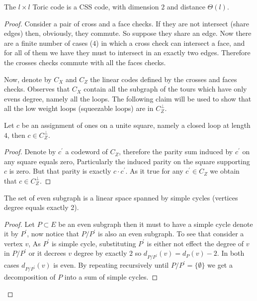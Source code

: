 \documentclass[12pt,a4paper]{article}
\begin{document}
\begin{claim}
  The $l \times l$  Toric code is a CSS code, with dimension $2$ and distance $\Theta\left( l \right)$.   
\end{claim}
\begin{proof}
  Consider a pair of cross and a face checks. If they are not intersect (share edges) then, obviously, they commute. So suppose they share an edge. Now there are a finite number of cases ($4$) in which a cross check can intersect a face, and for all of them we have they must to intersect in an exactly two edges. Therefore the crosses checks commute with all the faces checks. 

  Now, denote by $C_{X}$ and $C_{Z}$ the linear codes defined by the crosses and faces checks. Observes that $C_{X}$ contain all the subgraph of the tours which have only evens degree, namely all the loops. The following claim will be used to show that all the low weight loops (squeezable loops) are in $C_{Z}^{\perp}$. 
  \begin{claim} \label{claim:square}
    Let $c$ be an assignment of ones on a unite square, namely a closed loop at length $4$, then $c \in C_{Z}^{\perp}$.  
  \end{claim}
  \begin{proof}
    Denote by $c^{\prime}$ a codeword of $C_{Z}$, therefore the parity sum induced by $c^{\prime}$ on any square equals zero, Particularly the induced parity on the square supporting $c$ is zero. But that parity is exactly $c\cdot c^{\prime}$. As it true for any $c^{\prime} \in C_{Z}$ we obtain that $c \in C_{Z}^{\perp}$.  
  \end{proof}
  \begin{claim} \label{claim:velen}
    The set of even subgraph is a linear space spanned by simple cycles (vertices degree equals exactly 2).
  \end{claim}
  \begin{proof}
    Let $P \subset E$ be an even subgraph then it must to have a simple cycle denote it by $P^{\prime}$, now notice that $P/P^\prime$ is also an even subgraph. To see that consider a vertex $v$, As $P^{\prime}$ is simple cycle, substituting $P^{\prime}$ is either not effect the degree of $v$ in $P/P^{\prime}$ or it decrees $v$ degree by exactly $2$ so $d_{P/P^{\prime}}\left( v \right) = d_{P}\left( v \right) - 2$. In both cases $d_{P/P^{\prime}}\left( v \right)$ is even.
    By repeating recursively until $P/P^{\prime} = \{ \emptyset \}$ we get a decomposition of $P$ into a sum of simple cycles.   
  \end{proof}


\end{proof}
\end{document}
